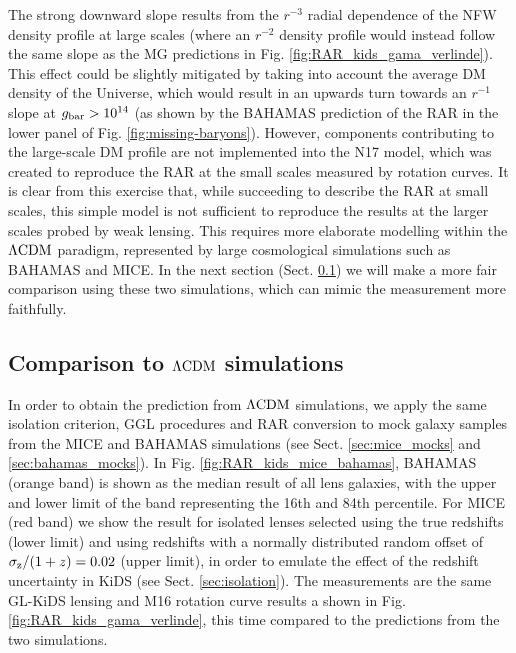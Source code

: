 \documentclass[usenatbib]{mnras}
\newcommand{\lcdm}{{\rm \Lambda CDM}}
\newcommand{\un}[1]{_{\rm #1}}
\begin{document}
The strong downward slope results from the $r^{-3}$ radial dependence of the NFW density profile at large scales (where an $r^{-2}$ density profile would instead follow the same slope as the MG predictions in Fig. \ref{fig:RAR_kids_gama_verlinde}). This effect could be slightly mitigated by taking into account the average DM density of the Universe, which would result in an upwards turn towards an $r^{-1}$ slope at $g\un{bar}>10^{14}$ (as shown by the BAHAMAS prediction of the RAR in the lower panel of Fig. \ref{fig:missing-baryons}). However, components contributing to the large-scale DM profile are not implemented into the N17 model, which was created to reproduce the RAR at the small scales measured by rotation curves. It is clear from this exercise that, while succeeding to describe the RAR at small scales, this simple model is not sufficient to reproduce the results at the larger scales probed by weak lensing. This requires more elaborate modelling within the $\lcdm$ paradigm, represented by large cosmological simulations such as BAHAMAS and MICE. In the next section (Sect. \ref{sec:results-simulations}) we will make a more fair comparison using these two simulations, which can mimic the measurement more faithfully.


\subsection{Comparison to $\lcdm$ simulations}
\label{sec:results-simulations}

In order to obtain the prediction from $\lcdm$ simulations, we apply the same isolation criterion, GGL procedures and RAR conversion to mock galaxy samples from the MICE and BAHAMAS simulations (see Sect. \ref{sec:mice_mocks} and \ref{sec:bahamas_mocks}). In Fig. \ref{fig:RAR_kids_mice_bahamas}, BAHAMAS (orange band) is shown as the median result of all lens galaxies, with the upper and lower limit of the band representing the 16th and 84th percentile. For MICE (red band) we show the result for isolated lenses selected using the true redshifts (lower limit) and using redshifts with a normally distributed random offset of $\sigma\un{z}/(1+z) = 0.02$ (upper limit), in order to emulate the effect of the redshift uncertainty in KiDS (see Sect. \ref{sec:isolation}). The measurements are the same GL-KiDS lensing and M16 rotation curve results a shown in Fig. \ref{fig:RAR_kids_gama_verlinde}, this time compared to the predictions from the two simulations.
\end{document}
